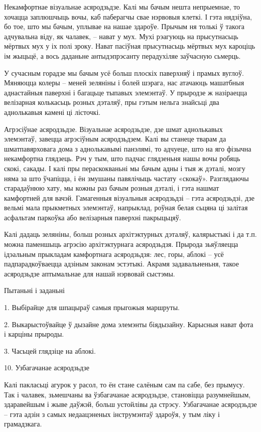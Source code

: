 Некамфортнае візуальнае асяродзьдзе. Калі мы бачым нешта непрыемнае, то хочацца заплюшчыць вочы, каб паберагчы свае нэрвовыя клеткі. І гэта нядзіўна, бо тое, што мы бачым, уплывае на нашае здароўе. Прычым ня толькі ў такога адчувальна віду, як чалавек, – нават у мух. Мухі рэагуюць на прысутнасьць мёртвых мух у іх полі зроку. Нават пасіўная прысутнасьць мёртвых мух кароціць ім жыцьцё, а вось даданьне антыдэпрэсанту перадухіляе заўчасную сьмерць.

У сучасным горадзе мы бачым усё больш плоскіх паверхняў і прамых вуглоў. Мяняюцца колеры – меней зеляніны і болей шэрага, нас атачаюць машатбныя аднастайныя паверхні і багацьце тыпавых элемэнтаў. У прыродзе ж назіраецца велізарная колькасьць розных дэталяў, пры гэтым нельга знайсьці два аднолькавыя камені ці лісточкі.

Агрэсіўнае асяродзьдзе. Візуальнае асяродзьдзе, дзе шмат аднолькавых элемэнтаў, завецца агрэсіўным асяродзьдзем. Калі вы станеце тварам да шматпавярховага дома з аднолькавымі панэлямі, то адчуеце, што на яго фізычна некамфортна глядзець. Рэч у тым, што падчас глядзеньня нашы вочы робяць скокі, сакады. І калі пры пераскокваньні мы бачым адны і тыя ж дэталі, мозгу няма за што ўчапіцца, і ён змушаны павялічыць частату «скокаў». Разглядаючы старадаўнюю хату, мы кожны раз бачым розныя дэталі, і гэта нашмат камфортней для вачэй. Гамагенныя візуальныя асяродзьдзі – гэта асяродзьдзі, дзе вельмі мала прыкметных элемэнтаў, напрыклад, роўная белая сьцяна ці залітая асфальтам паркоўка або велізарныя паверхні пакрыцьцяў.

Калі дадаць зеляніны, больш розных архітэктурных дэталяў, калярыстыкі і да т.п. можна паменшыць агрэсію архітэктурнага асяродзьдзя. Прырода зьяўляецца ідэальным прыкладам камфортнага асяродзьдзя: лес, горы, аблокі – усё падпарадкоўваецца адзіным законам эстэтыкі. Акрамя задавальненьня, такое асяродзьдзе аптымальнае для нашай нэрвовай сыстэмы.

Пытаньні і заданьні

1. Выбірайце для шпацыраў самыя прыгожыя маршруты.

2. Выкарыстоўвайце ў дызайне дома элемэнты біядызайну. Карысныя нават фота і карціны прыроды.

3. Часьцей глядзіце на аблокі.


10. Узбагачанае асяродзьдзе

Калі пакласьці агурок у расол, то ён стане салёным сам па сабе, без прымусу. Так і чалавек, зьмешчаны ва ўзбагачанае асяродзьдзе, становіцца разумнейшым, здаравейшым і жыве даўжэй, больш устойлівы да стрэсу. Узбагачанае асяродзьдзе – гэта адзін з самых недаацэненых інструмэнтаў здароўя, у тым ліку і грамадзкага.

